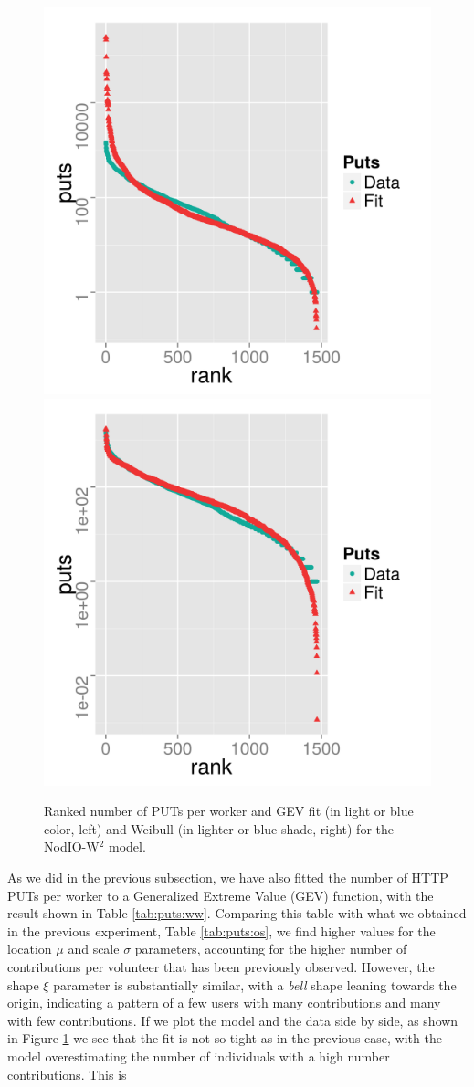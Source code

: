 \documentclass{sig-alternate}
\begin{document}
\begin{figure}[!htb]
\centering
\includegraphics[width=0.49\linewidth]{gev-fit-ww.png}
\includegraphics[width=0.49\linewidth]{weibull-fit-ww.png}
\caption{Ranked number of PUTs per worker and GEV fit (in light
  or blue color, left) 
and Weibull (in lighter or blue shade, right) for the {\sf NodIO-W$^2$} model.}  
\label{fig:gev:w2}
\end{figure}
%
As we did in the previous subsection, we have also fitted the number
of HTTP PUTs per worker to a  Generalized Extreme Value (GEV) function, with the result shown
in Table \ref{tab:puts:ww}. Comparing this table with what we obtained
in the previous experiment, Table \ref{tab:puts:os}, we find higher values
for the location $\mu$ and scale $\sigma$ parameters, accounting for
the higher number of contributions per volunteer that has been
previously observed. However, the shape $\xi$ parameter is
substantially similar, with a {\em bell} shape leaning towards the
origin, indicating a pattern of a few users with many contributions
and many with few contributions. If we plot the model and the data
side by side, as shown in Figure \ref{fig:gev:w2} we see that the fit
is not so tight as in the previous case, with the model overestimating
the number of individuals with a high number contributions. This is
\end{document}

